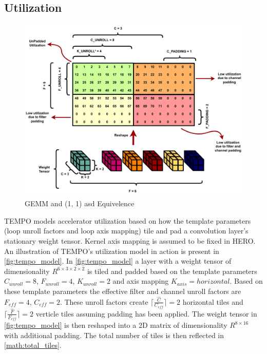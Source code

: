 \subsection{Utilization}
\label{chap:dataflow_dse:exploring:tempo_model:utilization}

\begin{figure}[]
    \centering
    \includegraphics[scale=0.45]{fig/Lasso_ilus.pdf}
    \caption{\ac{GEMM} and (1, 1) asd Equivelence}
    \label{fig:tempo_model}
\end{figure}

TEMPO models accelerator utilization based on how the template parameters (loop
unroll factors and loop axis mapping) tile and pad a convolution layer's
stationary weight tensor.  Kernel axis mapping is assumed to be fixed in HERO. An illustration of TEMPO's
utilization model in action is present in \autoref{fig:tempo_model}. In
\autoref{fig:tempo_model} a layer with a weight tensor of dimensionality
$R^{6\times 3\times 2\times 2}$ is tiled and padded based on the template
parameters $C_{unroll}=8$, $F_{unroll}=4$, $K_{unroll}=2$ and axis mapping
$K_{axis} = horizontal$. Based on these template parameters the effective filter
and channel unroll factors are $F_{eff} = 4$, $C_{eff}=2$. These unroll factors
create $\lceil \frac{\hat{C}}{C_{eff}} \rceil = 2$ horizontal tiles and $\lceil
\frac{\hat{F}}{F_{eff}} \rceil = 2$ verticle tiles assuming padding has been
applied. The weight tensor in \autoref{fig:tempo_model} is then reshaped into a
2D matrix of dimensionality $R^{8\times 16}$ with additional padding. The total
number of tiles is then reflected in \autoref{math:total_tiles}. 

